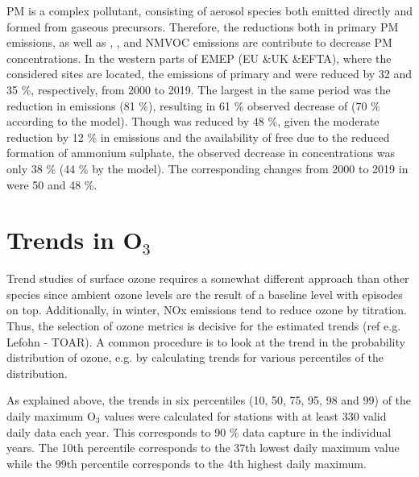 PM is a complex pollutant, consisting of aerosol species both emitted
directly and formed from gaseous precursors. Therefore, the reductions both in primary PM emissions, as well as \sox, \noii, \nhiii and NMVOC emissions are contribute to decrease PM concentrations. In the western parts of EMEP (EU \&UK \&EFTA), where the considered sites are located, the emissions of primary \PM[10] and \PM[2.5] were reduced by 32 and 35 \%, respectively, from 2000 to 2019. The largest in the same period was the reduction in \sox emissions (81 \%), resulting in 61 \% observed decrease of \soiv (70 \% according to the model). Though \noii was reduced by 48 \%, given the moderate reduction by 12 \% in \nhiii emissions and the availability of free \nhiii due to the reduced formation of ammonium sulphate, the observed decrease in \noiii concentrations was only 38 \% (44 \% by the model). The corresponding changes from 2000 to 2019 in \nhiv were 50 and 48 \%.



\section{\label{sec:Trends_O3}Trends in O$_3$ }
Trend studies of surface ozone requires a somewhat different approach than other species since ambient ozone levels are the result of a baseline level with episodes on top. Additionally, in winter, NOx emissions tend to reduce ozone by titration. Thus, the selection of ozone metrics is decisive for the estimated trends (ref e.g. Lefohn - TOAR). A common procedure is to look at the trend in the probability distribution of ozone, e.g. by calculating trends for various percentiles of the distribution.  

As explained above, the trends in six percentiles (10, 50, 75, 95, 98 and 99) of the daily maximum O$_3$ values were calculated for stations with at least 330 valid daily data each year. This corresponds to 90 \% data capture in the individual years. The 10th percentile corresponds to the 37th lowest daily maximum value while the 99th percentile corresponds to the 4th highest daily maximum. 

